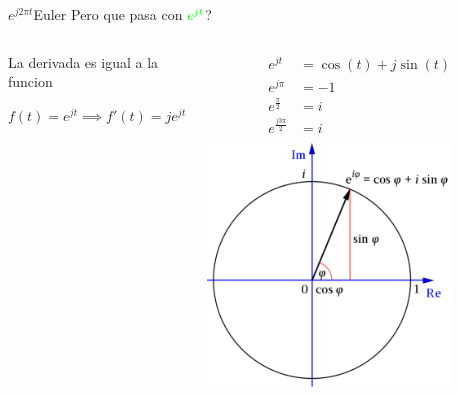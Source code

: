 \begin{frame}{$e^{j2\pi t}$}{Euler}
   Pero que pasa con $\LARGE\textcolor{green}{e^{jt}}$?
   \begin{columns}[onlytextwidth]
   \begin{block}{La derivada es igual a la funcion}
      \begin{center}
         $f(t) =e^{jt} \implies f'(t) =je^{jt}$
      \end{center}
   \end{block}
      \begin{align*}
         e^{jt}   &= \cos(t) + j \sin(t)\\
         e^{j\pi} &= -1\\
         e^{\frac{\pi}{2}} &= i\\
         e^{\frac{j3\pi}{2}} &= i\\
      \end{align*}
      \centering\includegraphics[width=0.8\textwidth]{2_clase/euler_senos_cosenos}
   \end{columns}
   \vfill
\end{frame}

